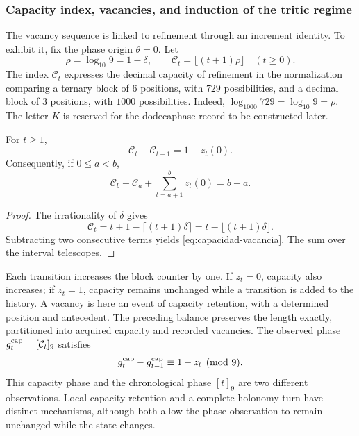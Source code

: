\subsubsection{Capacity index, vacancies, and induction of the tritic regime}
\label{vac-capacidad-trit}

The vacancy sequence is linked to refinement through an
increment identity. To exhibit it, fix the phase origin
\(\theta=0\). Let
\[
 \rho=\log_{10}9=1-\delta,\qquad
 \mathcal C_t=\lfloor(t+1)\rho\rfloor\quad(t\geq0).
\]
The index \(\mathcal C_t\) expresses the decimal capacity of refinement
in the normalization comparing a ternary block of \(6\) positions,
with \(729\) possibilities, and a decimal block of \(3\) positions,
with \(1000\) possibilities. Indeed,
\(\log_{1000}729=\log_{10}9=\rho\). The letter \(K\) is reserved for
the dodecaphase record to be constructed later.

\begin{proposition}
\label{prop:capacidad-vacancia}
For \(t\geq1\),
\begin{equation}
 \mathcal C_t-\mathcal C_{t-1}=1-z_t(0).
 \label{eq:capacidad-vacancia}
\end{equation}
Consequently, if \(0\leq a<b\),
\[
 \mathcal C_b-\mathcal C_a+
 \sum_{t=a+1}^{b}z_t(0)=b-a.
\]
\end{proposition}
\begin{proof}
The irrationality of \(\delta\) gives
\[
 \mathcal C_t
 =t+1-\lceil(t+1)\delta\rceil
 =t-\lfloor(t+1)\delta\rfloor.
\]
Subtracting two consecutive terms yields
\eqref{eq:capacidad-vacancia}. The sum over the interval telescopes.
\end{proof}

Each transition increases the block counter by one. If
\(z_t=0\), capacity also increases; if \(z_t=1\), capacity
remains unchanged while a transition is added to the history. A vacancy
is here an event of capacity retention, with a determined position and
antecedent. The preceding balance preserves the length exactly,
partitioned into acquired capacity and recorded vacancies. The observed phase
\(g_t^{\rm cap}=[\mathcal C_t]_9\) satisfies
\[
 g_t^{\rm cap}-g_{t-1}^{\rm cap}\equiv1-z_t\pmod9.
\]
This capacity phase and the chronological phase \([t]_9\) are two
different observations. Local capacity retention and a complete
holonomy turn have distinct mechanisms, although both
allow the phase observation to remain unchanged while the state changes.

